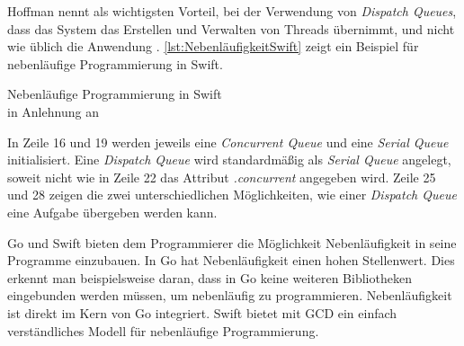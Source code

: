 Hoffman nennt als wichtigsten Vorteil, bei der Verwendung von \textit{Dispatch Queues}, dass das System das Erstellen und Verwalten von Threads übernimmt, und nicht wie üblich die Anwendung \cite[S.255]{Hoffman.2017}.
\autoref{lst:NebenläufigkeitSwift} zeigt ein Beispiel für nebenläufige Programmierung in Swift.

\begin{listing}[H]
\caption{Nebenläufige Programmierung in Swift \\ in Anlehnung an \cite[S.255ff]{Hoffman.2017}}
\label{lst:NebenläufigkeitSwift}
\end{listing}

In Zeile 16 und 19 werden jeweils eine \textit{Concurrent Queue} und eine \textit{Serial Queue} initialisiert.
Eine \textit{Dispatch Queue} wird standardmäßig als \textit{Serial Queue} angelegt, soweit nicht wie in Zeile 22 das Attribut \textit{.concurrent} angegeben wird.
Zeile 25 und 28 zeigen die zwei unterschiedlichen Möglichkeiten, wie einer \textit{Dispatch Queue} eine Aufgabe übergeben werden kann.

Go und Swift bieten dem Programmierer die Möglichkeit Nebenläufigkeit in seine Programme einzubauen. 
In Go hat Nebenläufigkeit einen hohen Stellenwert. 
Dies erkennt man beispielsweise daran, dass in Go keine weiteren Bibliotheken eingebunden werden müssen, um nebenläufig zu programmieren.
Nebenläufigkeit ist direkt im Kern von Go integriert.
Swift bietet mit GCD ein einfach verständliches Modell für nebenläufige Programmierung. 